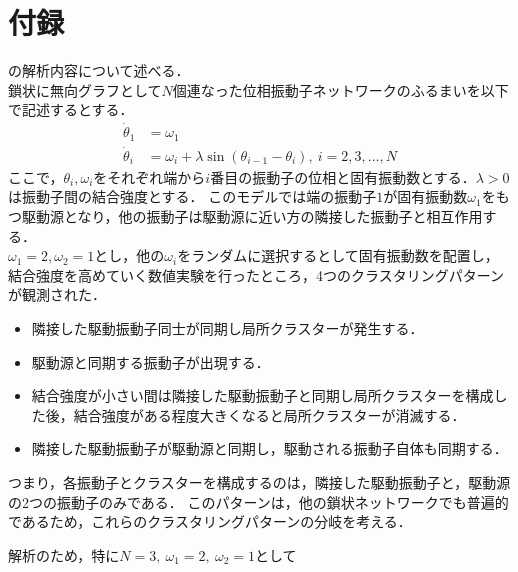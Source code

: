 \documentclass[../main]{subfiles}
\begin{document}
\chapter{付録}
\label{chap:appendix}
\cite{XiaHuang:130506}の解析内容について述べる．\\
鎖状に無向グラフとして$N$個連なった位相振動子ネットワークのふるまいを以下で記述するとする．
\begin{align*}
    \dot{\theta}_1&=\omega_1\\
    \dot{\theta}_i&=\omega_i+\lambda\sin(\theta_{i-1}-\theta_i),\ i=2,3,\ldots,N
\end{align*}
ここで，$\theta_i,\omega_i$をそれぞれ端から$i$番目の振動子の位相と固有振動数とする．$\lambda>0$は振動子間の結合強度とする．
このモデルでは端の振動子$1$が固有振動数$\omega_1$をもつ駆動源となり，他の振動子は駆動源に近い方の隣接した振動子と相互作用する．\\

$\omega_1=2,\omega_2=1$とし，他の$\omega_i$をランダムに選択するとして固有振動数を配置し，結合強度を高めていく数値実験を行ったところ，4つのクラスタリングパターンが観測された．
\begin{itemize}
    \item 隣接した駆動振動子同士が同期し局所クラスターが発生する．
    \item 駆動源と同期する振動子が出現する．
    \item 結合強度が小さい間は隣接した駆動振動子と同期し局所クラスターを構成した後，結合強度がある程度大きくなると局所クラスターが消滅する．
    \item 隣接した駆動振動子が駆動源と同期し，駆動される振動子自体も同期する．
\end{itemize}
つまり，各振動子とクラスターを構成するのは，隣接した駆動振動子と，駆動源の2つの振動子のみである．
このパターンは，他の鎖状ネットワークでも普遍的であるため，これらのクラスタリングパターンの分岐を考える．

解析のため，特に$N=3,\ \omega_1=2,\ \omega_2=1$として
\end{document}
